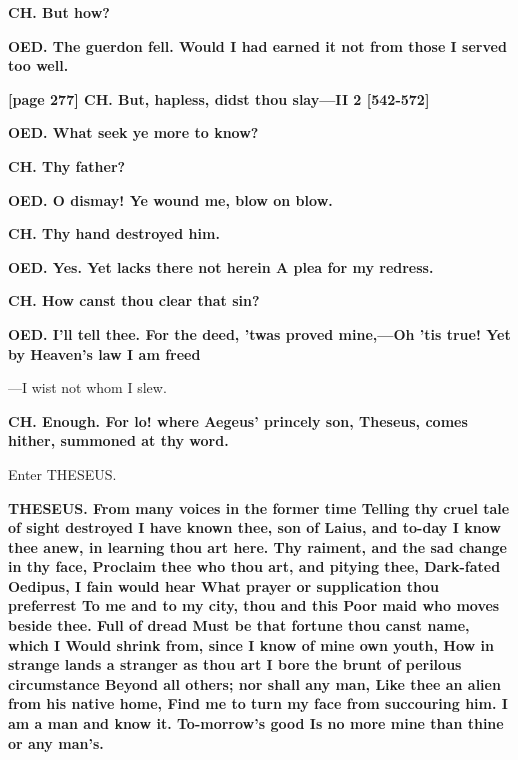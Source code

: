 \documentclass[11pt,letter]{book}
\begin{document}
\par \textbf{CH. But how?}
\par 

\par \textbf{OED. The guerdon fell. Would I had earned it not from those I served too well.}
\par 

\par \textbf{[page 277] CH. But, hapless, didst thou slay—II 2 [542-572]}
\par 

\par \textbf{OED. What seek ye more to know?}
\par 

\par \textbf{CH. Thy father?}
\par 

\par \textbf{OED. O dismay! Ye wound me, blow on blow.}
\par 

\par \textbf{CH. Thy hand destroyed him.}
\par 

\par \textbf{OED. Yes. Yet lacks there not herein A plea for my redress.}
\par 

\par \textbf{CH. How canst thou clear that sin?}
\par 

\par \textbf{OED. I’ll tell thee. For the deed, ’twas proved mine,—Oh ’tis true! Yet by Heaven’s law I am freed}
\par  —I wist not whom I slew.

\par \textbf{CH. Enough. For lo! where Aegeus’ princely son, Theseus, comes hither, summoned at thy word.}
\par 

\par  Enter THESEUS.

\par \textbf{THESEUS. From many voices in the former time Telling thy cruel tale of sight destroyed I have known thee, son of Laius, and to-day I know thee anew, in learning thou art here. Thy raiment, and the sad change in thy face, Proclaim thee who thou art, and pitying thee, Dark-fated Oedipus, I fain would hear What prayer or supplication thou preferrest To me and to my city, thou and this Poor maid who moves beside thee. Full of dread Must be that fortune thou canst name, which I Would shrink from, since I know of mine own youth, How in strange lands a stranger as thou art I bore the brunt of perilous circumstance Beyond all others; nor shall any man, Like thee an alien from his native home, Find me to turn my face from succouring him. I am a man and know it. To-morrow’s good Is no more mine than thine or any man’s.}
\par 
\end{document}

